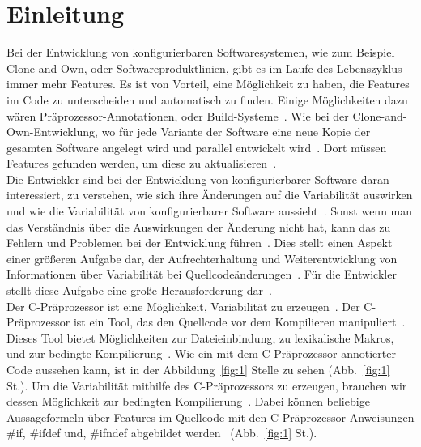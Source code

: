 \chapter{Einleitung}
%


Bei der Entwicklung von konfigurierbaren Softwaresystemen, wie zum Beispiel Clone-and-Own, oder Softwareproduktlinien, gibt es im Laufe des Lebenszyklus immer mehr Features. Es ist von Vorteil, eine Möglichkeit zu haben, die Features im Code zu unterscheiden und automatisch zu finden. Einige Möglichkeiten dazu wären Präprozessor-Annotationen, oder Build-Systeme~\cite{ABKS13}. Wie bei der Clone-and-Own-Entwicklung, wo für jede Variante der Software eine neue Kopie der gesamten Software angelegt wird und parallel entwickelt wird~\cite{BTS+:ESECFSE22}. Dort müssen Features gefunden werden, um diese zu aktualisieren~\cite{BTS+:ESECFSE22,KTSB:ICSE21,KB:VaMoS20,KB:ESECFSE20,KKK+:SPLC18,ZSL+:ICSE18}.\\



Die Entwickler sind bei der Entwicklung von konfigurierbarer Software daran interessiert, zu verstehen, wie sich ihre Änderungen auf die Variabilität auswirken und wie die Variabilität von konfigurierbarer Software aussieht~\cite{BTS+:ESECFSE22}. Sonst wenn man das Verständnis über die Auswirkungen der Änderung nicht hat, kann das zu Fehlern und Problemen bei der Entwicklung führen~\cite{BTS+:ESECFSE22,NBA+:JSS15, NST+:SoSyM22,SBT:JSS19, SNB+:VaMoS21,KATS:TOSEM12}. Dies stellt einen Aspekt einer größeren Aufgabe dar, der Aufrechterhaltung und Weiterentwicklung von Informationen über Variabilität bei Quellcodeänderungen~\cite{BTS+:ESECFSE22}. Für die Entwickler stellt diese Aufgabe eine große Herausforderung dar~\cite{BTS+:ESECFSE22,PCA+:VAMOS13, PTD+:EMSE16, SHA:SPLC12}.\\


Der C-Präprozessor ist eine Möglichkeit, Variabilität zu erzeugen~\cite{ABKS13}. Der C-Präprozessor ist ein Tool, das den Quellcode vor dem Kompilieren manipuliert~\cite{ABKS13}. Dieses Tool bietet Möglichkeiten zur Dateieinbindung, zu lexikalische Makros, und zur bedingte Kompilierung~\cite{ABKS13}. Wie ein mit dem  C-Präprozessor annotierter Code aussehen kann, ist in der Abbildung~\ref{fig:1} Stelle  zu sehen (Abb.~\ref{fig:1} St.). Um die Variabilität mithilfe des C-Präprozessors zu erzeugen, brauchen wir dessen Möglichkeit zur bedingten Kompilierung~\cite{ABKS13}. Dabei können beliebige Aussageformeln über Features im Quellcode mit den C-Präprozessor-Anweisungen \#if, \#ifdef und, \#ifndef abgebildet werden~\cite{BTS+:ESECFSE22} (Abb.~\ref{fig:1} St.).\\



